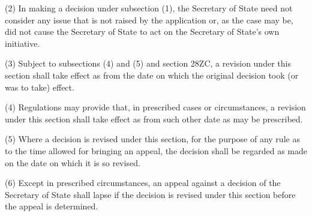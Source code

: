 \documentclass[12pt,a4paper]{article}
\begin{document}
(2)
In making a decision under subsection (1), the Secretary of State need not consider any issue that is not raised by the application or, as the case may be, did not cause the Secretary of State to act on the Secretary of State’s own initiative.

(3)
Subject to subsections (4) and (5) and section 28ZC, a revision under this section shall take effect as from the date on which the original decision took (or was to take) effect.

(4)
Regulations may provide that, in prescribed cases or circumstances, a revision under this section shall take effect as from such other date as may be prescribed.

(5)
Where a decision is revised under this section, for the purpose of any rule as to the time allowed for bringing an appeal, the decision shall be regarded as made on the date on which it is so revised.

(6)
Except in prescribed circumstances, an appeal against a decision of the Secretary of State shall lapse if the decision is revised under this section before the appeal is determined.
\end{document}
